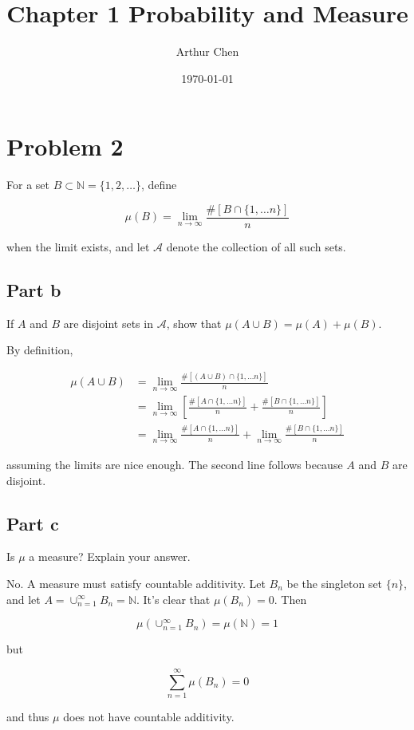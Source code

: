 \documentclass{article}
\author{Arthur Chen}
\title{Chapter 1 Probability and Measure}
\date{\today}
\newcommand{\N}{\mathbb{N}}
\newcommand{\A}{\mathcal{A}}
\begin{document}
\maketitle

\section*{Problem 2}

For a set $B \subset \N = \{1, 2, \dots\}$, define

\[
\mu(B) = \lim_{n \rightarrow \infty} \frac{\#[B \cap \{1, \dots n \}]}{n}
\]

when the limit exists, and let $\A$ denote the collection of all such sets.

\subsection*{Part b}

If $A$ and $B$ are disjoint sets in $\A$, show that $\mu(A \cup B) = \mu(A) + \mu(B)$.

By definition,

\begin{align*}
\mu(A \cup B) &= \lim_{n \rightarrow \infty} \frac{\#[(A \cup B) \cap \{1, \dots n \}]}{n} \\
&= \lim_{n \rightarrow \infty} \left[ \frac{\#[A \cap \{1, \dots n \}]}{n} + \frac{\#[B \cap \{1, \dots n \}]}{n}
\right] \\
&= \lim_{n \rightarrow \infty} \frac{\#[A \cap \{1, \dots n \}]}{n} + \lim_{n \rightarrow \infty} \frac{\#[B \cap \{1, \dots n \}]}{n}
\end{align*}

assuming the limits are nice enough. The second line follows because $A$ and $B$ are disjoint.

\subsection*{Part c}

Is $\mu$ a measure? Explain your answer.

No. A measure must satisfy countable additivity. Let $B_n$ be the singleton set $\{n\}$, and let $A = \cup_{n=1}^\infty B_n = \N$. It's clear that $\mu(B_n) = 0$. Then

\[
\mu(\cup_{n=1}^\infty B_n) = \mu(\N) = 1
\]

but

\[
\sum_{n=1}^\infty \mu(B_n) = 0
\]

and thus $\mu$ does not have countable additivity.
\end{document}
